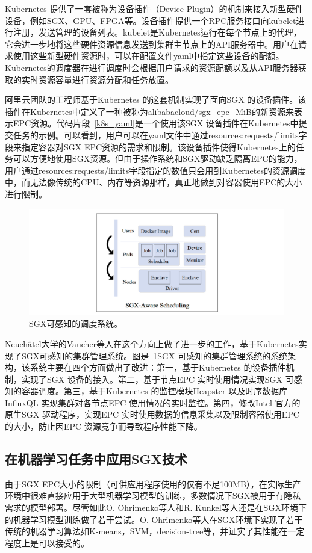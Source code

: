 Kubernetes 提供了一套被称为设备插件（Device Plugin）的机制来接入新型硬件设备，例如SGX、GPU、FPGA等。设备插件提供一个RPC服务接口向kubelet进行注册，发送管理的设备列表。kubelet是Kubernetes运行在每个节点上的代理，它会进一步地将这些硬件资源信息发送到集群主节点上的API服务器中。用户在请求使用这些新型硬件资源时，可以在配置文件yaml中指定这些设备的配额。Kubernetes的调度器在进行调度时会根据用户请求的资源配额以及从API服务器获取的实时资源容量进行资源分配和任务放置。

阿里云团队的工程师基于Kubernetes 的这套机制实现了面向SGX 的设备插件。该插件在Kubernetes中定义了一种被称为alibabacloud/sgx\_epc\_MiB的新资源来表示EPC资源。代码片段~\ref{k8s_yaml}是一个使用该SGX 设备插件在Kubernetes中提交任务的示例。可以看到，用户可以在yaml文件中通过resources:requests/limits字段来指定容器对SGX EPC资源的需求和限制。该设备插件使得Kubernetes上的任务可以方便地使用SGX资源。但由于操作系统和SGX驱动缺乏隔离EPC的能力，用户通过resources:requests/limits字段指定的数值只会用到Kubernetes的资源调度中，而无法像传统的CPU、内存等资源那样，真正地做到对容器使用EPC的大小进行限制。

\begin{figure}[h]
    \centerline{\includegraphics[width=\textwidth]{figures/sgx-aware-sche.png}}
    \caption{SGX可感知的调度系统。}
    \label{sgx_aware_sche}
\end{figure}

Neuchâtel大学的Vaucher等人在这个方向上做了进一步的工作，基于Kubernetes实现了SGX可感知的集群管理系统。图是~\ref{sgx_aware_sche}SGX 可感知的集群管理系统的系统架构，该系统主要在四个方面做出了改进：第一，基于Kubernetes 的设备插件机制，实现了SGX 设备的接入。第二，基于节点EPC 实时使用情况实现SGX 可感知的容器调度。第三，基于Kubernetes 的监控模块Heapster 以及时序数据库InfluxQL 实现集群对各节点EPC 使用情况的实时监控。第四，修改Intel 官方的原生SGX 驱动程序，实现EPC 实时使用数据的信息采集以及限制容器使用EPC 的大小，防止因EPC 资源竞争而导致程序性能下降。

\subsection{在机器学习任务中应用SGX技术}
由于SGX EPC大小的限制（可供应用程序使用的仅有不足100MB），在实际生产环境中很难直接应用于大型机器学习模型的训练，多数情况下SGX被用于有隐私需求的模型部署。尽管如此O. Ohrimenko等人\parencite{197247}和R. Kunkel\parencite{kunkel2019tensorscone}等人还是在SGX环境下的机器学习模型训练做了若干尝试。O. Ohrimenko等人在SGX环境下实现了若干传统的机器学习算法如K-means，SVM，decision-tree等，并证实了其性能在一定程度上是可以接受的。

